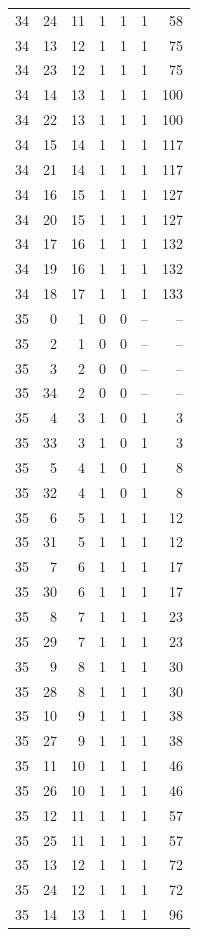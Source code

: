 \begin{longtable}{rrrrrrr}
34 & 24 & 11 & 1 & 1 & 1 & 58\\
34 & 13 & 12 & 1 & 1 & 1 & 75\\
34 & 23 & 12 & 1 & 1 & 1 & 75\\
34 & 14 & 13 & 1 & 1 & 1 & 100\\
34 & 22 & 13 & 1 & 1 & 1 & 100\\
34 & 15 & 14 & 1 & 1 & 1 & 117\\
34 & 21 & 14 & 1 & 1 & 1 & 117\\
34 & 16 & 15 & 1 & 1 & 1 & 127\\
34 & 20 & 15 & 1 & 1 & 1 & 127\\
34 & 17 & 16 & 1 & 1 & 1 & 132\\
34 & 19 & 16 & 1 & 1 & 1 & 132\\
34 & 18 & 17 & 1 & 1 & 1 & 133\\
35 & 0 & 1 & 0 & 0 & -- & --\\
35 & 2 & 1 & 0 & 0 & -- & --\\
35 & 3 & 2 & 0 & 0 & -- & --\\
35 & 34 & 2 & 0 & 0 & -- & --\\
35 & 4 & 3 & 1 & 0 & 1 & 3\\
35 & 33 & 3 & 1 & 0 & 1 & 3\\
35 & 5 & 4 & 1 & 0 & 1 & 8\\
35 & 32 & 4 & 1 & 0 & 1 & 8\\
35 & 6 & 5 & 1 & 1 & 1 & 12\\
35 & 31 & 5 & 1 & 1 & 1 & 12\\
35 & 7 & 6 & 1 & 1 & 1 & 17\\
35 & 30 & 6 & 1 & 1 & 1 & 17\\
35 & 8 & 7 & 1 & 1 & 1 & 23\\
35 & 29 & 7 & 1 & 1 & 1 & 23\\
35 & 9 & 8 & 1 & 1 & 1 & 30\\
35 & 28 & 8 & 1 & 1 & 1 & 30\\
35 & 10 & 9 & 1 & 1 & 1 & 38\\
35 & 27 & 9 & 1 & 1 & 1 & 38\\
35 & 11 & 10 & 1 & 1 & 1 & 46\\
35 & 26 & 10 & 1 & 1 & 1 & 46\\
35 & 12 & 11 & 1 & 1 & 1 & 57\\
35 & 25 & 11 & 1 & 1 & 1 & 57\\
35 & 13 & 12 & 1 & 1 & 1 & 72\\
35 & 24 & 12 & 1 & 1 & 1 & 72\\
35 & 14 & 13 & 1 & 1 & 1 & 96\\

\end{longtable}
